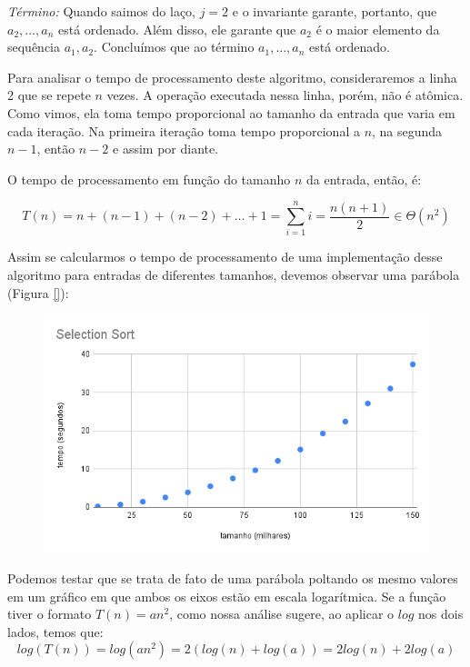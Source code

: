   {\em Término:} Quando saimos do laço, $j=2$ e o invariante garante, portanto, que $a_2, \dots, a_n$ está ordenado.
  Além disso, ele garante que $a_2$ é o maior elemento da sequência $a_1, a_2$.
  Concluímos que ao término $a_1, \dots, a_n$ está ordenado.

  \vspace{1em}
  

  Para analisar o tempo de processamento deste algoritmo, consideraremos a linha 2 que se repete $n$ vezes.
  A operação executada nessa linha, porém, não é atômica.
  Como vimos, ela toma tempo proporcional ao tamanho da entrada que varia em cada iteração.
  Na primeira iteração toma tempo proporcional a $n$, na segunda $n-1$, então $n-2$ e assim por diante.

  O tempo de processamento em função do tamanho $n$ da entrada, então, é:

  \begin{displaymath}
    T(n) = n + (n-1) + (n-2) + \dots + 1 = \sum_{i=1}^{n}i = \frac{n(n+1)}{2} \in \Theta(n^2)
  \end{displaymath}

  Assim se calcularmos o tempo de processamento de uma implementação desse algoritmo para entradas de diferentes tamanhos, devemos observar uma parábola (Figura \ref{}):

  \begin{figure}
    \includegraphics[width=\textwidth]{imagens/SelectionSort1.png}
  \end{figure}

  Podemos testar que se trata de fato de uma parábola poltando os mesmo valores em um gráfico em que ambos os eixos estão em escala logarítmica.
  Se a função tiver o formato $T(n) = an^2$, como nossa análise sugere, ao aplicar o $log$ nos dois lados, temos que:
  \begin{displaymath}
  log(T(n)) = log(an^2) = 2(log(n) + log(a)) = 2log(n) + 2log(a)
  \end{displaymath}
  
